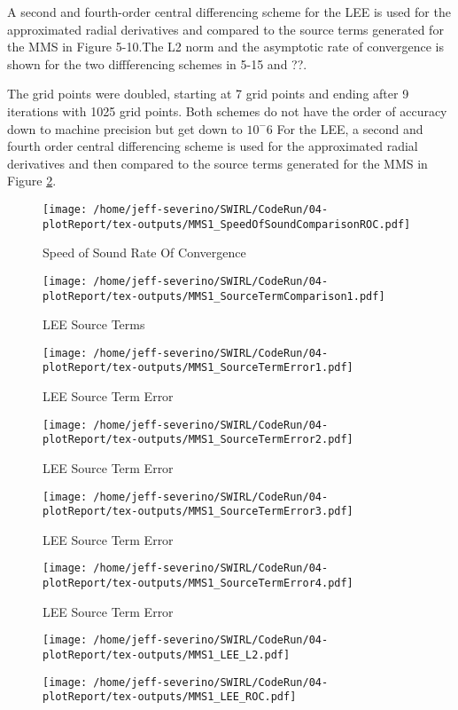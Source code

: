 A second and fourth-order central differencing scheme for the LEE is used for the approximated radial derivatives and compared to the source terms generated for the MMS in Figure 5-10.The L2 norm and the asymptotic rate of convergence is shown for the two diffferencing schemes in 5-15 and ??. 

The grid points were doubled, starting at 7 grid points and ending after 9 iterations with 1025 grid points. Both schemes do not have the order of accuracy down to machine precision but get down to $10^-6$
For the LEE, a second and fourth order central differencing scheme is used
for the approximated radial derivatives and then compared to the source terms 
generated for the MMS in Figure \ref{fig:6}. 
\begin{figure}[h!]
    \centering
    \texttt{[image: /home/jeff-severino/SWIRL/CodeRun/04-plotReport/tex-outputs/MMS1\_SpeedOfSoundComparisonROC.pdf]}
    \caption{ Speed of Sound Rate Of Convergence}
    \label{fig:SpeedOfSoundROC}
\end{figure}



\begin{figure}[h!]
    \centering
    \texttt{[image: /home/jeff-severino/SWIRL/CodeRun/04-plotReport/tex-outputs/MMS1\_SourceTermComparison1.pdf]}
    \caption{LEE Source Terms}
    \label{fig:6}
\end{figure}


\begin{figure}[h!]
    \centering
    \texttt{[image: /home/jeff-severino/SWIRL/CodeRun/04-plotReport/tex-outputs/MMS1\_SourceTermError1.pdf]}
    \caption{LEE Source Term Error}
    \label{fig:7}
\end{figure}


\begin{figure}[h!]
    \centering
    \texttt{[image: /home/jeff-severino/SWIRL/CodeRun/04-plotReport/tex-outputs/MMS1\_SourceTermError2.pdf]}
    \caption{LEE Source Term Error}
    \label{fig:7}
\end{figure}


\begin{figure}[h!]
    \centering
    \texttt{[image: /home/jeff-severino/SWIRL/CodeRun/04-plotReport/tex-outputs/MMS1\_SourceTermError3.pdf]}
    \caption{LEE Source Term Error}
    \label{fig:7}
\end{figure}


\begin{figure}[h!]
    \centering
    \texttt{[image: /home/jeff-severino/SWIRL/CodeRun/04-plotReport/tex-outputs/MMS1\_SourceTermError4.pdf]}
    \caption{LEE Source Term Error}
    \label{fig:7}
\end{figure}


\begin{figure}[h!]
    \centering
    \texttt{[image: /home/jeff-severino/SWIRL/CodeRun/04-plotReport/tex-outputs/MMS1\_LEE\_L2.pdf]}
    \label{fig:9}
\end{figure}

\begin{figure}[h!]
    \centering
    \texttt{[image: /home/jeff-severino/SWIRL/CodeRun/04-plotReport/tex-outputs/MMS1\_LEE\_ROC.pdf]}
    \label{fig:9}
\end{figure}
